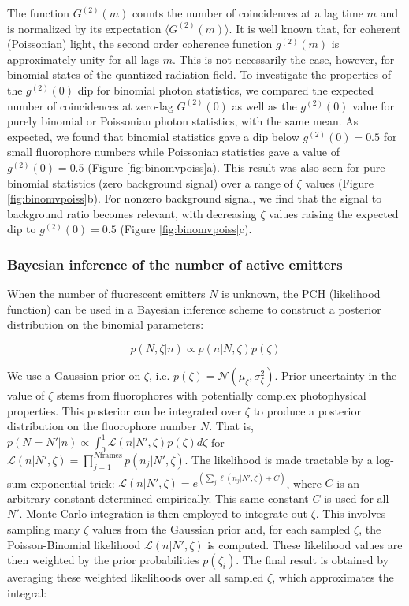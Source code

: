 The function $G^{(2)}(m)$ counts the number of coincidences at a lag time $m$ and is normalized by its expectation $\langle G^{(2)}(m)\rangle$. It is well known that, for coherent (Poissonian) light, the second order coherence function $g^{(2)}(m)$ is approximately unity for all lags $m$. This is not necessarily the case, however, for binomial states \parencite{Stoler1985} of the quantized radiation field. To investigate the properties of the $g^{(2)}(0)$ dip for binomial photon statistics, we compared the expected number of coincidences at zero-lag $G^{(2)}(0)$ as well as the $g^{(2)}(0)$ value for purely binomial or Poissonian photon statistics, with the same mean. As expected, we found that binomial statistics gave a dip below $g^{(2)}(0) =0.5$ for small fluorophore numbers while Poissonian statistics gave a value of $g^{(2)}(0) =0.5$ (Figure \ref{fig:binomvpoiss}a). This result was also seen for pure binomial statistics (zero background signal) over a range of $\zeta$ values (Figure \ref{fig:binomvpoiss}b). For nonzero background signal, we find that the signal to background ratio becomes relevant, with decreasing $\zeta$ values raising the expected dip to $g^{(2)}(0) =0.5$ (Figure \ref{fig:binomvpoiss}c).


\subsubsection{Bayesian inference of the number of active emitters}

When the number of fluorescent emitters $N$ is unknown, the PCH (likelihood function) can be used in a Bayesian inference scheme to construct a posterior distribution on the binomial parameters:

\begin{equation}
p(N,\zeta\lvert n) \propto p(n\lvert N,\zeta)p(\zeta)
\end{equation}

We use a Gaussian prior on $\zeta$, i.e. $p(\zeta) = \mathcal{N}(\mu_{\zeta},\sigma_{\zeta}^2)$. Prior uncertainty in the value of $\zeta$ stems from fluorophores with potentially complex photophysical properties. This posterior can be integrated over $\zeta$ to produce a posterior distribution on the fluorophore number $N$. That is, $p(N=N'\lvert n) \propto \int_{0}^{1} \mathcal{L}(n\lvert N',\zeta)p(\zeta) d\zeta$ for $\mathcal{L}(n\lvert N',\zeta)=\prod_{j=1}^{N\mathrm{frames}} p(n_{j}\lvert N',\zeta)$. The likelihood is made tractable by a log-sum-exponential trick: $\mathcal{L}(n\lvert N',\zeta) = e^{\left(\sum_{j}\ell (n_{j}\lvert N',\zeta) + C\right)}$, where $C$ is an arbitrary constant determined empirically. This same constant $C$ is used for all $N'$. Monte Carlo integration is then employed to integrate out $\zeta$. This involves sampling many $\zeta$ values from the Gaussian prior and, for each sampled $\zeta$, the Poisson-Binomial likelihood $\mathcal{L}(n\lvert N',\zeta)$ is computed. These likelihood values are then weighted by the prior probabilities $p(\zeta_i)$. The final result is obtained by averaging these weighted likelihoods over all sampled $\zeta$, which approximates the integral:

